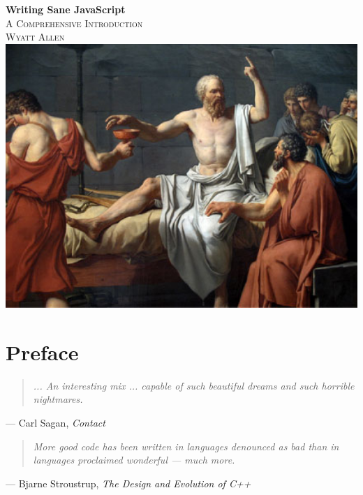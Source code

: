 \documentclass[11pt,letter]{book}
\begin{document}
    \frontmatter

    \begin{titlepage}
        \begin{center}
            { \huge \bfseries Writing Sane JavaScript}\\[0.4cm]
            \textsc{\Large A Comprehensive Introduction}\\[0.5cm]
            \textsc{Wyatt Allen}\\
            \vspace{1.2cm}
            \includegraphics[width=14cm]{socrates-hemlock}
            \vfill
        \end{center}
    \end{titlepage}
    
    \tableofcontents 
    
    \chapter{Preface}
    \begin{quote}
        \emph{
            ... An interesting mix ... capable of such beautiful dreams and such horrible 
            nightmares.
        }
    \end{quote}
    \begin{flushright}
        --- Carl Sagan, \emph{Contact}
    \end{flushright}
    \vspace{1.2cm}
    
    \begin{quote}
        \emph{
            More good code has been written in languages denounced as bad than in languages 
            proclaimed wonderful --- much more.
        }
    \end{quote}
    \begin{flushright}
        --- Bjarne Stroustrup, \emph{The Design and Evolution of C++}
    \end{flushright}
    \vspace{1.2cm}
    
\end{document}

